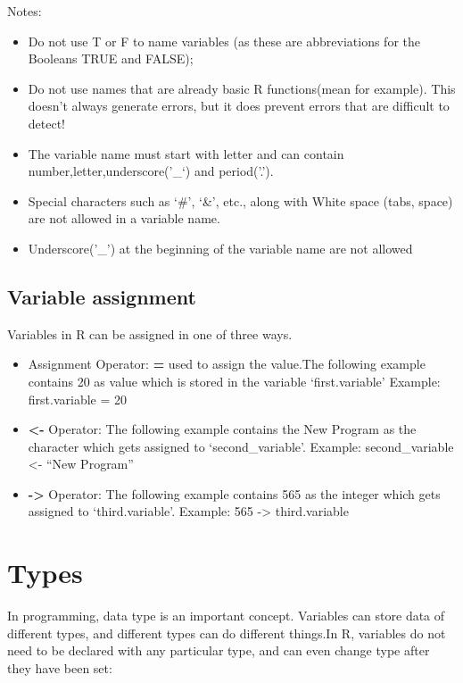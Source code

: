 \documentclass[
]{book}
\providecommand{\tightlist}{%
  \setlength{\itemsep}{0pt}\setlength{\parskip}{0pt}}
\begin{document}
Notes:

\begin{itemize}
\tightlist
\item
  Do not use T or F to name variables (as these are abbreviations for the Booleans TRUE and FALSE);
\item
  Do not use names that are already basic R functions(mean for example). This doesn't always generate errors, but it does prevent errors that are difficult to detect!
\item
  The variable name must start with letter and can contain number,letter,underscore('\_`) and period('.').
\item
  Special characters such as `\#', `\&', etc., along with White space (tabs, space) are not allowed in a variable name.
\item
  Underscore('\_') at the beginning of the variable name are not allowed
\end{itemize}

\hypertarget{variable-assignment}{%
\subsection*{Variable assignment}\label{variable-assignment}}

Variables in R can be assigned in one of three ways.

\begin{itemize}
\item
  Assignment Operator: \textbf{=} used to assign the value.The following example contains 20 as value which is stored in the variable `first.variable' Example: first.variable = 20
\item
  \textbf{\textless-} Operator: The following example contains the New Program as the character which gets assigned to `second\_variable'.
  Example: second\_variable \textless- ``New Program''
\item
  \textbf{-\textgreater{}} Operator: The following example contains 565 as the integer which gets assigned to `third.variable'.
  Example: 565 -\textgreater{} third.variable
\end{itemize}

\hypertarget{types}{%
\section{Types}\label{types}}

In programming, data type is an important concept. Variables can store data of different types, and different types can do different things.In R, variables do not need to be declared with any particular type, and can even change type after they have been set:
\end{document}
